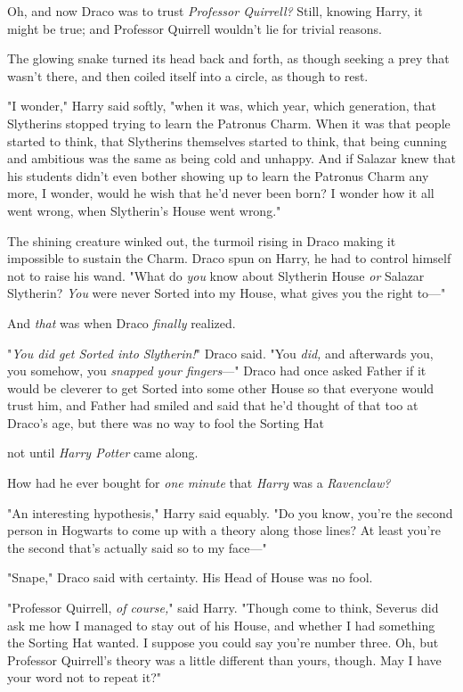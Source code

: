 Oh, and now Draco was to trust \emph{Professor Quirrell?} Still, knowing Harry,
it might be true; and Professor Quirrell wouldn't lie for trivial reasons.

The glowing snake turned its head back and forth, as though seeking a prey that
wasn't there, and then coiled itself into a circle, as though to rest.

"I wonder," Harry said softly, "when it was, which year, which generation, that
Slytherins stopped trying to learn the Patronus Charm. When it was that people
started to think, that Slytherins themselves started to think, that being
cunning and ambitious was the same as being cold and unhappy. And if Salazar
knew that his students didn't even bother showing up to learn the Patronus
Charm any more, I wonder, would he wish that he'd never been born? I wonder how
it all went wrong, when Slytherin's House went wrong."

The shining creature winked out, the turmoil rising in Draco making it
impossible to sustain the Charm. Draco spun on Harry, he had to control himself
not to raise his wand. "What do \emph{you} know about Slytherin House \emph{or}
Salazar Slytherin? \emph{You} were never Sorted into my House, what gives you
the right to\mbox{---}"

And \emph{that} was when Draco \emph{finally} realized.

"\emph{You did get Sorted into Slytherin!}" Draco said. "You \emph{did,} and
afterwards you, you somehow, you \emph{snapped your fingers}\mbox{---}" Draco had once
asked Father if it would be cleverer to get Sorted into some other House so
that everyone would trust him, and Father had smiled and said that he'd thought
of that too at Draco's age, but there was no way to fool the Sorting Hat{\el}

{\el} not until \emph{Harry Potter} came along.

How had he ever bought for \emph{one minute} that \emph{Harry} was a
\emph{Ravenclaw?}

"An interesting hypothesis," Harry said equably. "Do you know, you're the
second person in Hogwarts to come up with a theory along those lines? At least
you're the second that's actually said so to my face\mbox{---}"

"Snape," Draco said with certainty. His Head of House was no fool.

"Professor Quirrell, \emph{of course,}" said Harry. "Though come to think,
Severus did ask me how I managed to stay out of his House, and whether I had
something the Sorting Hat wanted. I suppose you could say you're number three.
Oh, but Professor Quirrell's theory was a little different than yours, though.
May I have your word not to repeat it?"

